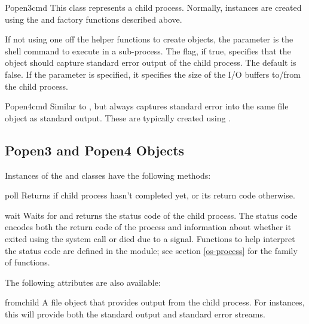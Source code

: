 \begin{classdesc}{Popen3}{cmd}
This class represents a child process.  Normally, 
instances are created using the  and
 factory functions described above.

If not using one off the helper functions to create 
objects, the parameter  is the shell command to execute in a
sub-process.  The  flag, if true, specifies that
the object should capture standard error output of the child process.
The default is false.  If the  parameter is specified, it
specifies the size of the I/O buffers to/from the child process.
\end{classdesc}

\begin{classdesc}{Popen4}{cmd}
Similar to , but always captures standard error into the
same file object as standard output.  These are typically created
using .
\end{classdesc}


\subsection{Popen3 and Popen4 Objects \label{popen3-objects}}

Instances of the  and  classes have the
following methods:

\begin{methoddesc}{poll}{}
Returns  if child process hasn't completed yet, or its return 
code otherwise.
\end{methoddesc}

\begin{methoddesc}{wait}{}
Waits for and returns the status code of the child process.  The
status code encodes both the return code of the process and
information about whether it exited using the 
system call or died due to a signal.  Functions to help interpret the
status code are defined in the  module; see section
\ref{os-process} for the  family of functions.
\end{methoddesc}


The following attributes are also available: 

\begin{memberdesc}{fromchild}
A file object that provides output from the child process.  For
 instances, this will provide both the standard output
and standard error streams.
\end{memberdesc}

